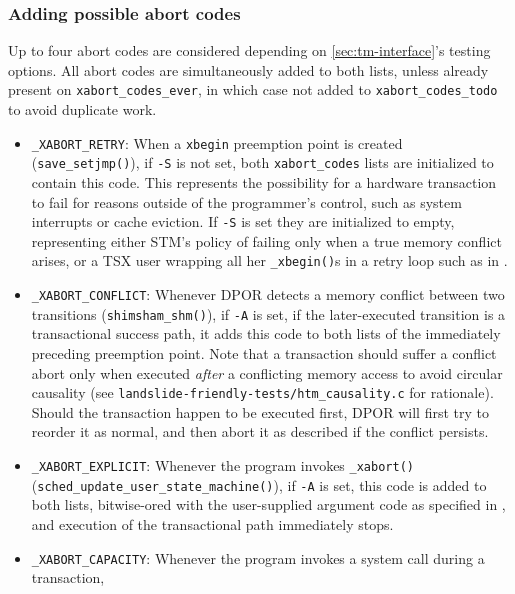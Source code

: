 \subsubsection{Adding possible abort codes}
\label{sec:txn-abort-codes}

Up to four abort codes are considered depending on \cref{sec:tm-interface}'s testing options.
All abort codes are simultaneously added to both lists,
unless already present on {\tt xabort\_codes\_ever},
in which case not added to {\tt xabort\_codes\_todo} to avoid duplicate work.
\begin{itemize}
	\item {\tt \_XABORT\_RETRY}:
		When a {\tt xbegin} preemption point is created ({\tt save\_setjmp()}),
		if {\tt -S} is not set,
		both {\tt xabort\_codes} lists are initialized to contain this code.
		This represents the possibility for a hardware transaction to fail
		for reasons outside of the programmer's control, such as system interrupts or cache eviction.
		If {\tt -S} is set they are initialized to empty,
		representing either STM's policy of failing only when a true memory conflict arises,
		or a TSX user wrapping all her {\tt \_xbegin()}s in a retry loop such as in \cite{sigbovik-htm}.
	\item {\tt \_XABORT\_CONFLICT}:
		Whenever DPOR detects a memory conflict between two transitions ({\tt shimsham\_shm()}),
		if {\tt -A} is set,
		if the later-executed transition is a transactional success path,
		it adds this code to both lists of the immediately preceding preemption point.
		Note that a transaction should suffer a conflict abort
		only when executed {\em after} a conflicting memory access
		to avoid circular causality
		(see {\tt landslide-friendly-tests/htm\_causality.c} for rationale).
		Should the transaction happen to be executed first,
		DPOR will first try to reorder it as normal,
		and then abort it as described if the conflict persists.
	\item {\tt \_XABORT\_EXPLICIT}:
		Whenever the program invokes {\tt \_xabort()} ({\tt sched\_update\_user\_\allowbreak{}state\_machine()}),
		if {\tt -A} is set,
		this code is added to both lists, bitwise-ored with the user-supplied argument code
		as specified in \cite{htm-gcc},
		and execution of the transactional path immediately stops.
	\item {\tt \_XABORT\_CAPACITY}:
		Whenever the program invokes a system call during a transaction,

\end{itemize}
